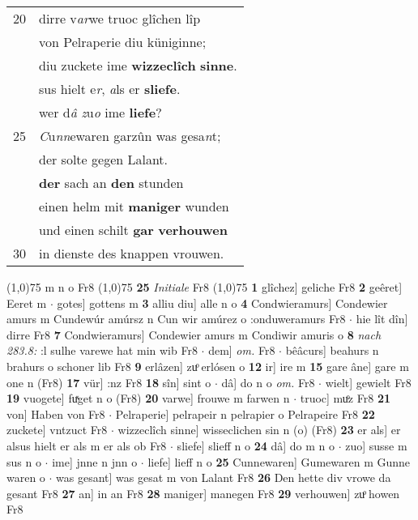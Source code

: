 \documentclass[8pt,a4paper,notitlepage]{article}
\begin{document}
\begin{table}[ht]
\begin{minipage}[t]{0.5\linewidth}
\begin{tabular}{rl}
20 & dirre v\textit{ar}we truoc glîchen lîp\\ 
 & von Pelraperie diu küniginne;\\ 
 & diu zuckete ime \textbf{wizzeclîch} \textbf{sinne}.\\ 
 & sus hielt e\textit{r}, \textit{a}ls er \textbf{sliefe}.\\ 
 & wer d\textit{â} \textit{z}u\textit{o} ime \textbf{liefe}?\\ 
25 & \textit{C}u\textit{nn}ewaren garzûn was gesa\textit{n}t;\\ 
 & der solte gegen Lalant.\\ 
 & \textbf{der} sach an \textbf{den} stunden\\ 
 & einen helm mit \textbf{maniger} wunden\\ 
 & und einen schilt \textbf{gar} \textbf{verhouwen}\\ 
30 & in dienste des knappen vrouwen.\\ 
\end{tabular}
\scriptsize
\line(1,0){75} \newline
m n o Fr8 \newline
\line(1,0){75} \newline
\textbf{25} \textit{Initiale} Fr8  \newline
\line(1,0){75} \newline
\textbf{1} glîchez] geliche Fr8 \textbf{2} geêret] Eeret m  $\cdot$ gotes] gottens m \textbf{3} alliu diu] alle n o \textbf{4} Condwieramurs] Condewier amurs m Cundewúr amúrsz n Cun wir amúrez o :onduweramurs Fr8  $\cdot$ hie lît dîn] dirre Fr8 \textbf{7} Condwieramurs] Condewier amurs m Condiwir amuris o \textbf{8} \textit{nach 283.8:} :l sulhe varewe hat min wib Fr8   $\cdot$ dem] \textit{om.} Fr8  $\cdot$ bêâcurs] beahurs n brahurs o schoner lib Fr8 \textbf{9} erlâzen] zuͦ erlósen o \textbf{12} ir] ire m \textbf{15} gare âne] gare m one n (Fr8) \textbf{17} vür] :nz Fr8 \textbf{18} sîn] sint o  $\cdot$ dâ] do n o \textit{om.} Fr8  $\cdot$ wielt] gewielt Fr8 \textbf{19} vuogete] fuͯget n o (Fr8) \textbf{20} varwe] frouwe m farwen n  $\cdot$ truoc] muͦz Fr8 \textbf{21} von] Haben von Fr8  $\cdot$ Pelraperie] pelrapeir n pelrapier o Pelrapeire Fr8 \textbf{22} zuckete] vntzuct Fr8  $\cdot$ wizzeclîch sinne] wisseclichen sin n (o) (Fr8) \textbf{23} er als] er alsus hielt er als m er als ob Fr8  $\cdot$ sliefe] slieff n o \textbf{24} dâ] do m n o  $\cdot$ zuo] susse m sus n o  $\cdot$ ime] jnne n jnn o  $\cdot$ liefe] lieff n o \textbf{25} Cunnewaren] Gumewaren m Gunne waren o  $\cdot$ was gesant] was gesat m von Lalant Fr8 \textbf{26} Den hette div vrowe da gesant Fr8 \textbf{27} an] in an Fr8 \textbf{28} maniger] manegen Fr8 \textbf{29} verhouwen] zuͦ howen Fr8 \newline
\end{minipage}
\end{table}
\end{document}
